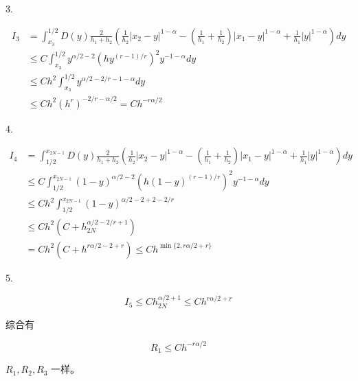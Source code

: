 \documentclass{ctexart}
\begin{document}
3.

\begin{equation}
    \begin{aligned}
        I_3 &= \int_{x_3}^{1/2}D(y) \frac{2}{h_1 + h_{2}} 
        ( \frac{1}{h_{2}} |x_{2}-y|^{1-\alpha} 
        - (\frac{1}{h_{1}}+\frac{1}{h_{2}}) |x_{1}-y|^{1-\alpha}
        +  \frac{1}{h_{1}}|y|^{1-\alpha} )  dy      \\
        &\le C \int_{x_3}^{1/2} y^{\alpha/2-2} (h y^{(r-1)/r})^2 y^{-1-\alpha} dy \\
        &\le C h^2 \int_{x_3}^{1/2} y^{\alpha/2 - 2/r -1 - \alpha} dy       \\
        &\le C h^2 (h^r)^{-2/r-\alpha/2} = C h^{-r\alpha/2}
    \end{aligned}
\end{equation}


4. 

\begin{equation}
    \begin{aligned}
        I_4 &= \int_{1/2}^{x_{2N-1}}D(y) \frac{2}{h_1 + h_{2}} 
        ( \frac{1}{h_{2}} |x_{2}-y|^{1-\alpha} 
        - (\frac{1}{h_{1}}+\frac{1}{h_{2}}) |x_{1}-y|^{1-\alpha}
        +  \frac{1}{h_{1}}|y|^{1-\alpha} )  dy      \\
        &\le C \int_{1/2}^{x_{2N-1}} (1-y)^{\alpha/2-2} (h (1-y)^{(r-1)/r})^2 y^{-1-\alpha} dy  \\
        &\le C h^2 \int_{1/2}^{x_{2N-1}} (1-y)^{\alpha/2-2 + 2 - 2/r}       \\
        &\le C h^2 (C + h_{2N}^{\alpha/2-2/r+1})        \\
        &= C h^2 (C + h^{r\alpha/2-2+r}) \le C h^{\min\{2, r\alpha/2+r\}}
    \end{aligned}
\end{equation}

5.

\begin{equation}
    I_5 \le C h_{2N}^{\alpha/2+1} \le C h^{r\alpha/2+r}
\end{equation}

综合有

\begin{equation}
    R_1 \le C h^{-r\alpha/2}
\end{equation}

\(R_1, R_2, R_3\) 一样。\\
\end{document}
